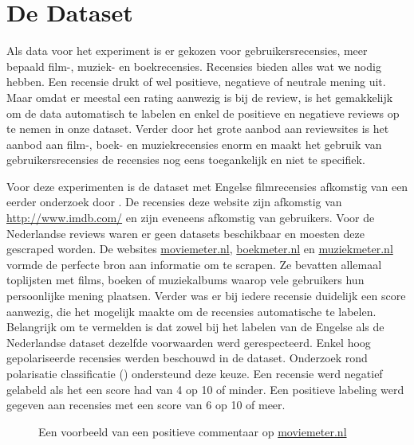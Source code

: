 \section{De Dataset}\label{De Dataset}

Als data voor het experiment is er gekozen voor gebruikersrecensies, meer bepaald film-, muziek- en boekrecensies. Recensies bieden alles wat we nodig hebben. Een recensie drukt of wel positieve, negatieve of neutrale mening uit. Maar omdat er meestal een rating aanwezig is bij de review, is het gemakkelijk om de data automatisch te labelen en enkel de positieve en negatieve reviews op te nemen in onze dataset. Verder door het grote aanbod aan reviewsites is het aanbod aan film-, boek- en muziekrecensies enorm en maakt het gebruik van gebruikersrecensies de recensies nog eens toegankelijk en niet te specifiek. 

Voor deze experimenten is de dataset met Engelse filmrecensies afkomstig van een eerder onderzoek door \cite{maas-EtAl:2011:ACL-HLT2011}. De recensies deze website zijn afkomstig van \url{http://www.imdb.com/} en zijn eveneens afkomstig van gebruikers. Voor de Nederlandse reviews waren er geen datasets beschikbaar en moesten deze gescraped worden. De websites \url{moviemeter.nl}, \url{boekmeter.nl} en \url{muziekmeter.nl} vormde de perfecte bron aan informatie om te scrapen. Ze bevatten allemaal toplijsten met films, boeken of muziekalbums waarop vele gebruikers hun persoonlijke mening plaatsen. Verder was er bij iedere recensie duidelijk een score aanwezig, die het mogelijk maakte om de recensies automatische te labelen. Belangrijk om te vermelden is dat zowel bij het labelen van de Engelse als de Nederlandse dataset dezelfde voorwaarden werd gerespecteerd. Enkel hoog gepolariseerde recensies werden beschouwd in de dataset. Onderzoek rond polarisatie classificatie (\cite{maas-EtAl:2011:ACL-HLT2011}) ondersteund deze keuze. Een recensie werd negatief gelabeld als het een score had van 4 op 10 of minder. Een positieve labeling werd gegeven aan recensies met een score van 6 op 10 of meer.\\

\begin{figure}[h]%
    \centering
    \caption{Een voorbeeld van een positieve commentaar op \url{moviemeter.nl}}%
\end{figure}
\newline

